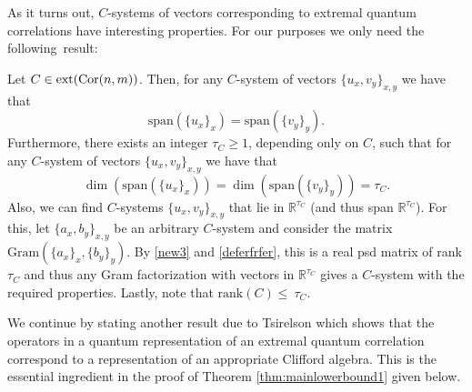 \documentclass{siamart}
\begin{document}
{As it turns out, 
$C$-systems of vectors corresponding to extremal quantum correlations have interesting properties. For our purposes  we only  need the following~result:}

 \medskip
  \begin{lemma}\cite[Lemma 3.1]{TS87}\label{lem:tsirelson}
Let  $ C\in {\rm ext}({\rm Cor}(n,m))$. Then, for any $C$-system of vectors $\{u_x,v_y\}_{x,y}$ we have that 
\begin{equation}\label{deferfrfer}
  {\mathrm{span}}(\{u_x\}_x) =  {\mathrm{span}}(\{v_y\}_y).
\end{equation}  
 Furthermore,  there exists an integer $\tau_C\ge 1$, depending only on $C$,   such that for any $C$-system of vectors $\{u_x,v_y\}_{x,y}$ we have that  
\begin{equation}\label{new3} 
{\dim \left( {\mathrm{span}}(\{u_x\}_x) \right)=\dim \left( {\mathrm{span}}(\{v_y\}_y) \right)}=\tau_C. 
\end{equation}
 Also, we can find $C$-systems $\{u_x,v_y\}_{x,y}$ that lie in ${\mathbb{R}}^{\tau_C}$ (and thus  span ${\mathbb{R}}^{\tau_C}$). For this,  let $\{a_x,b_y\}_{x,y}$ be an arbitrary  $C$-system and consider the matrix ${\mathrm{Gram}}(\{a_x\}_x,\{b_y\}_y)$. By \eqref{new3} and \eqref{deferfrfer}, this  is a real psd matrix of  rank $\tau_C$ and thus any Gram factorization with vectors in ${\mathbb{R}}^{\tau_C}$ gives  a $C$-system with the required properties. Lastly, note that ${\mathrm{rank}}(C)\le~\tau_C$.
\end{lemma}
\medskip

We continue by stating  another result  due to Tsirelson which shows that  the operators in a  quantum representation of an extremal  quantum  correlation correspond   to a representation of an appropriate  Clifford algebra. This is the essential ingredient in the proof of Theorem \ref{thm:mainlowerbound1} given below.
\end{document}
